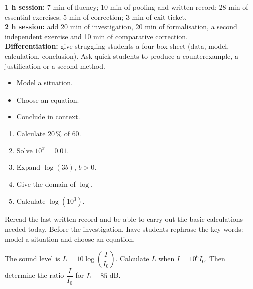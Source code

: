 \ifprof
\begin{methode}
\textbf{1 h session:} 7 min of fluency; 10 min of pooling and written record; 28 min of essential exercises; 5 min of correction; 3 min of exit ticket.\\
\textbf{2 h session:} add 20 min of investigation, 20 min of formalisation, a second independent exercise and 10 min of comparative correction.\\
\textbf{Differentiation:} give struggling students a four-box sheet (data, model, calculation, conclusion). Ask quick students to produce a counterexample, a justification or a second method.
\end{methode}
\fi
{}
\begin{objectifs}\begin{itemize}\item Model a situation.\item Choose an equation.\item Conclude in context.\end{itemize}\end{objectifs}
\begin{automatismes}\begin{enumerate}\item Calculate $20\,\%$ of $60$. \item Solve $10^x=0.01$. \item Expand $\log(3b)$, $b>0$. \item Give the domain of $\log$. \rep{$]0,+\infty[$}\item Calculate $\log(10^3)$. \end{enumerate}\end{automatismes}
\begin{prerequis}Reread the last written record and be able to carry out the basic calculations needed today. Before the investigation, have students rephrase the key words: model a situation and choose an equation.\end{prerequis}

\begin{activite}
The sound level is $L=10\log\!\left(\dfrac I{I_0}\right)$. Calculate $L$ when $I=10^6I_0$. Then determine the ratio $\dfrac I{I_0}$ for $L=85$ dB.

\end{activite}


